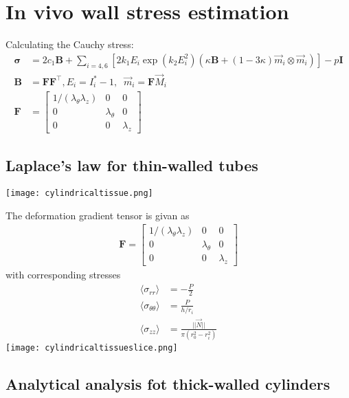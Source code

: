 \documentclass[../main.tex]{subfiles}
\begin{document}
\section{In vivo wall stress estimation}

Calculating the Cauchy stress:
\begin{align}
    \bm{\sigma} &= 2c_1\textbf{B} + \sum_{i=4,6}\left[2k_1E_i\exp(k_2E_i^2)(\kappa\textbf{B}+(1-3\kappa)\vec{m}_i\otimes\vec{m}_i)\right] - p\textbf{I} \\
    \textbf{B} &= \textbf{F}\textbf{F}^{\top}, E_i = I^*_i - 1, \;\; \vec{m}_i = \textbf{F}\vec{M}_i\\
    \textbf{F} &= \left[\begin{matrix}
        1/(\lambda_{\theta}\lambda_z) & 0 & 0 \\
        0 & \lambda_{\theta} & 0 \\
        0 & 0 & \lambda_z
    \end{matrix}\right]
\end{align}

\subsection{Laplace's law for thin-walled tubes}

\texttt{[image: cylindricaltissue.png]}

The deformation gradient tensor is givan as
\begin{align}
    \textbf{F} = \left[\begin{matrix}
        1/(\lambda_{\theta}\lambda_z) & 0 & 0 \\
        0 & \lambda_{\theta} & 0 \\
        0 & 0 & \lambda_z
    \end{matrix}\right]
\end{align}
with corresponding stresses
\begin{align}
    \langle \sigma_{rr} \rangle &= -\frac{P}{2} \\
    \langle \sigma_{\theta\theta} \rangle &= \frac{P}{h/r_i}\\
    \langle \sigma_{zz} \rangle &= \frac{||\vec{N}||}{\pi(r^2_0-r^2_i)}
\end{align}
\texttt{[image: cylindricaltissueslice.png]}

\subsection{Analytical analysis fot thick-walled cylinders}
\end{document}

